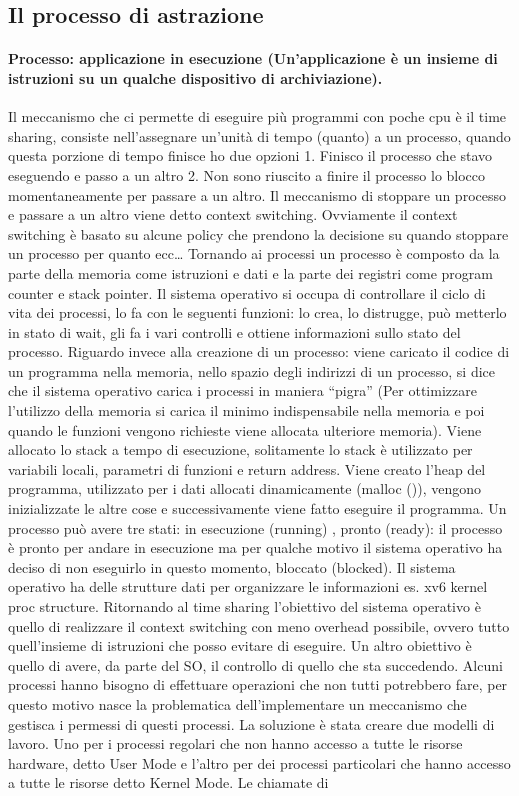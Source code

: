 \documentclass{article}
\begin{document}
\subsection{Il processo di astrazione}
\paragraph{Processo: applicazione in esecuzione (Un’applicazione è un insieme di istruzioni su un qualche dispositivo di archiviazione).}
Il meccanismo che ci permette di eseguire più programmi con poche cpu è il time sharing, consiste nell’assegnare un’unità di tempo (quanto) a un processo, quando questa porzione di tempo finisce ho due opzioni 1. Finisco il processo che stavo eseguendo e passo a un altro 2. Non sono riuscito a finire il processo lo blocco momentaneamente per passare a un altro. Il meccanismo di stoppare un processo e passare a un altro viene detto context switching. Ovviamente il context switching è basato su alcune policy che prendono la decisione su quando stoppare un processo per quanto ecc… Tornando ai processi un processo è composto da la parte della memoria come istruzioni e dati e la parte dei registri come program counter e stack pointer. Il sistema operativo si occupa di controllare il ciclo di vita dei processi, lo fa con le seguenti funzioni: lo crea, lo distrugge, può metterlo in stato di wait, gli fa i vari controlli e ottiene informazioni sullo stato del processo. Riguardo invece alla creazione di un processo: viene caricato il codice di un programma nella memoria, nello spazio degli indirizzi di un processo, si dice che il sistema operativo carica i processi in maniera “pigra” (Per ottimizzare l’utilizzo della memoria si carica il minimo indispensabile nella memoria e poi quando le funzioni vengono richieste viene allocata ulteriore memoria). Viene allocato lo stack a tempo di esecuzione, solitamente lo stack è utilizzato per variabili locali, parametri di funzioni e return address. Viene creato l’heap del programma, utilizzato per i dati allocati dinamicamente (malloc ()), vengono inizializzate le altre cose e successivamente viene fatto eseguire il programma. Un processo può avere tre stati: in esecuzione (running) , pronto (ready): il processo è pronto per andare in esecuzione ma per qualche motivo il sistema operativo ha deciso di non eseguirlo in questo momento, bloccato (blocked). Il sistema operativo ha delle strutture dati per organizzare le informazioni es. xv6 kernel proc structure. Ritornando al time sharing l’obiettivo del sistema operativo è quello di realizzare il context switching con meno overhead possibile, ovvero tutto quell’insieme di istruzioni che posso evitare di eseguire. Un altro obiettivo è quello di avere, da parte del SO, il controllo di quello che sta succedendo. Alcuni processi hanno bisogno di effettuare operazioni che non tutti potrebbero fare, per questo motivo nasce la problematica dell’implementare un meccanismo che gestisca i permessi di questi processi. La soluzione è stata creare due modelli di lavoro. Uno per i processi regolari che non hanno accesso a tutte le risorse hardware, detto User Mode e l’altro per dei processi particolari che hanno accesso a tutte le risorse detto Kernel Mode. Le chiamate di 
\end{document}
